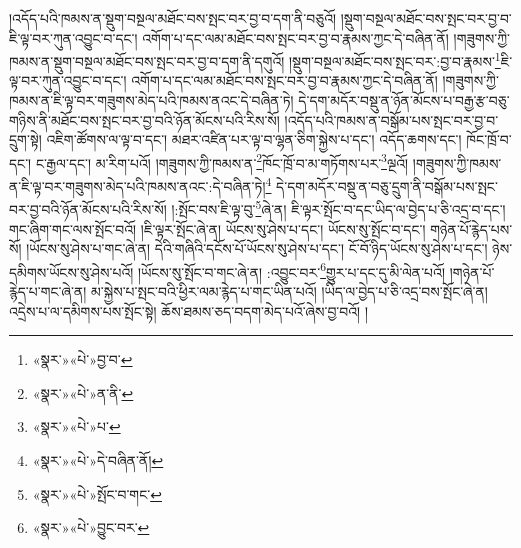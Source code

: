 །འདོད་པའི་ཁམས་ན་སྡུག་བསྔལ་མཐོང་བས་སྤང་བར་བྱ་བ་དག་ནི་བཅུའོ། །སྡུག་བསྔལ་མཐོང་བས་སྤང་བར་བྱ་བ་ཇི་ལྟ་བར་ཀུན་འབྱུང་བ་དང་། འགོག་པ་དང་ལམ་མཐོང་བས་སྤང་བར་བྱ་བ་རྣམས་ཀྱང་དེ་བཞིན་ནོ། །གཟུགས་ཀྱི་ཁམས་ན་སྡུག་བསྔལ་མཐོང་བས་སྤང་བར་བྱ་བ་དག་ནི་དགུའོ། །སྡུག་བསྔལ་མཐོང་བས་སྤང་བར་:བྱ་བ་རྣམས་\footnote{«སྣར་»«པེ་»བྱ་བ་}ཇི་ལྟ་བར་ཀུན་འབྱུང་བ་དང་། འགོག་པ་དང་ལམ་མཐོང་བས་སྤང་བར་བྱ་བ་རྣམས་ཀྱང་དེ་བཞིན་ནོ། །གཟུགས་ཀྱི་ཁམས་ན་ཇི་ལྟ་བར་གཟུགས་མེད་པའི་ཁམས་ནའང་དེ་བཞིན་ཏེ། དེ་དག་མདོར་བསྡུ་ན་ཉོན་མོངས་པ་བརྒྱ་རྩ་བཅུ་གཉིས་ནི་མཐོང་བས་སྤང་བར་བྱ་བའི་ཉོན་མོངས་པའི་རིས་སོ། །འདོད་པའི་ཁམས་ན་བསྒོམ་པས་སྤང་བར་བྱ་བ་དྲུག་སྟེ། འཇིག་ཚོགས་ལ་ལྟ་བ་དང་། མཐར་འཛིན་པར་ལྟ་བ་ལྷན་ཅིག་སྐྱེས་པ་དང་། འདོད་ཆགས་དང་། ཁོང་ཁྲོ་བ་དང་། ང་རྒྱལ་དང་། མ་རིག་པའོ། །གཟུགས་ཀྱི་ཁམས་ན་\footnote{«སྣར་»«པེ་»ན་ནི་}ཁོང་ཁྲོ་བ་མ་གཏོགས་པར་\footnote{«སྣར་»«པེ་»པ་}ལྔའོ། །གཟུགས་ཀྱི་ཁམས་ན་ཇི་ལྟ་བར་གཟུགས་མེད་པའི་ཁམས་ནའང་:དེ་བཞིན་ཏེ།\footnote{«སྣར་»«པེ་»དེ་བཞིན་ནོ།} དེ་དག་མདོར་བསྡུ་ན་བཅུ་དྲུག་ནི་བསྒོམ་པས་སྤང་བར་བྱ་བའི་ཉོན་མོངས་པའི་རིས་སོ། །:སྤོང་བས་ཇི་ལྟ་བུ་\footnote{«སྣར་»«པེ་»སྤོང་བ་གང་}ཞེ་ན། ཇི་ལྟར་སྤོང་བ་དང་ཡིད་ལ་བྱེད་པ་ཅི་འདྲ་བ་དང་། གང་ཞིག་གང་ལས་སྤོང་བའོ། །ཇི་ལྟར་སྤོང་ཞེ་ན། ཡོངས་སུ་ཤེས་པ་དང་། ཡོངས་སུ་སྤོང་བ་དང་། གཉེན་པོ་རྙེད་པས་སོ། །ཡོངས་སུ་ཤེས་པ་གང་ཞེ་ན། དེའི་གཞིའི་དངོས་པོ་ཡོངས་སུ་ཤེས་པ་དང་། ངོ་བོ་ཉིད་ཡོངས་སུ་ཤེས་པ་དང་། ཉེས་དམིགས་ཡོངས་སུ་ཤེས་པའོ། །ཡོངས་སུ་སྤོང་བ་གང་ཞེ་ན། :འབྱུང་བར་\footnote{«སྣར་»«པེ་»བྱུང་བར་}གྱུར་པ་དང་དུ་མི་ལེན་པའོ། །གཉེན་པོ་རྙེད་པ་གང་ཞེ་ན། མ་སྐྱེས་པ་སྤང་བའི་ཕྱིར་ལམ་རྙེད་པ་གང་ཡིན་པའོ། །ཡིད་ལ་བྱེད་པ་ཅི་འདྲ་བས་སྤོང་ཞེ་ན། འདྲེས་པ་ལ་དམིགས་པས་སྤོང་སྟེ། ཆོས་ཐམས་ཅད་བདག་མེད་པའོ་ཞེས་བྱ་བའོ། །
